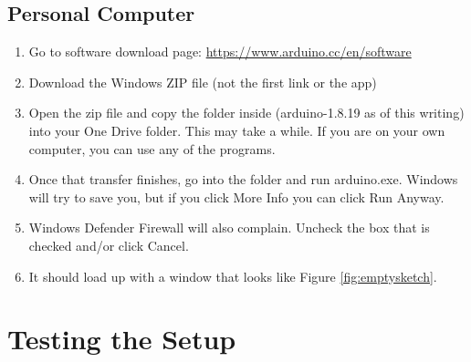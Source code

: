 \subsection{Personal Computer}
\begin{enumerate}
	\item Go to software download page: \href{https://www.arduino.cc/en/software}{https://www.arduino.cc/en/software}
	\item Download the Windows ZIP file (not the first link or the app)
	\item Open the zip file and copy the folder inside (arduino-1.8.19 as of this writing) into your One Drive folder. This may take a while. If you are on your own computer, you can use any of the programs.
	\item Once that transfer finishes, go into the folder and run arduino.exe. Windows will try to save you, but if you click More Info you can click Run Anyway.
	\item Windows Defender Firewall will also complain. Uncheck the box that is checked and/or click Cancel.
	\item It should load up with a window that looks like Figure \ref{fig:emptysketch}.
\end{enumerate}

\section{Testing the Setup}
